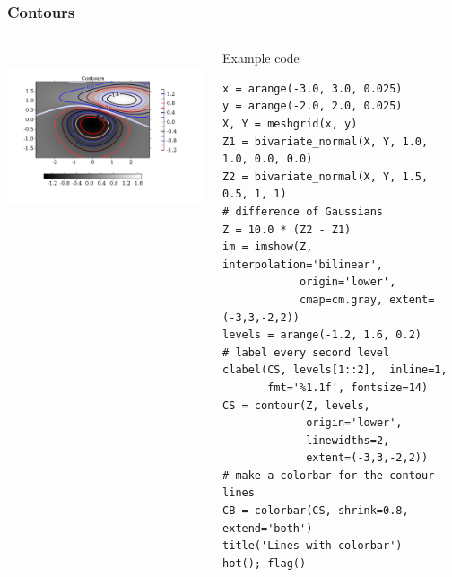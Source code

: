 \documentclass[14pt,compress]{beamer}
\begin{document}
\begin{frame}[fragile] \frametitle{Contours}
  \begin{columns}
    \hspace*{-0.5in}
  \includegraphics[height=2in, interpolate=true]{data/contour}  
    \begin{block}{Example code}
    \tiny
\begin{lstlisting}
x = arange(-3.0, 3.0, 0.025)
y = arange(-2.0, 2.0, 0.025)
X, Y = meshgrid(x, y)
Z1 = bivariate_normal(X, Y, 1.0, 1.0, 0.0, 0.0)
Z2 = bivariate_normal(X, Y, 1.5, 0.5, 1, 1)
# difference of Gaussians
Z = 10.0 * (Z2 - Z1)
im = imshow(Z, interpolation='bilinear', 
            origin='lower',
            cmap=cm.gray, extent=(-3,3,-2,2))
levels = arange(-1.2, 1.6, 0.2)
# label every second level
clabel(CS, levels[1::2],  inline=1,
       fmt='%1.1f', fontsize=14)
CS = contour(Z, levels,
             origin='lower',
             linewidths=2,
             extent=(-3,3,-2,2))
# make a colorbar for the contour lines
CB = colorbar(CS, shrink=0.8, extend='both')
title('Lines with colorbar')
hot(); flag()
\end{lstlisting}
  \end{block}
\end{columns}
\end{frame}
\end{document}
